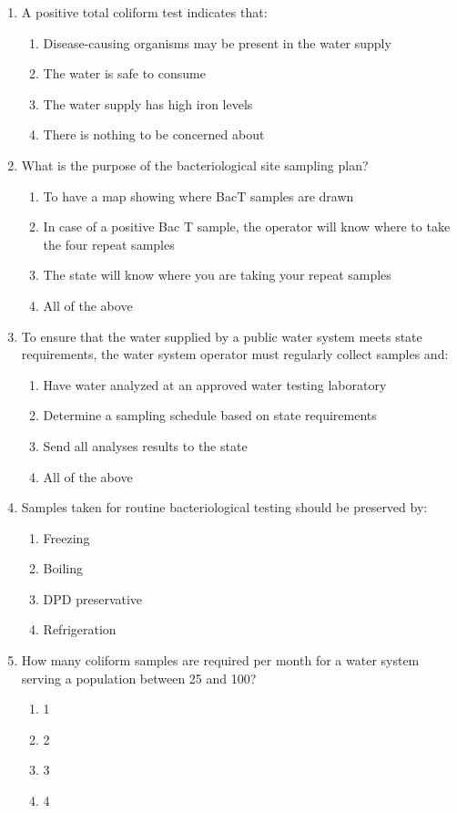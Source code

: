 \documentclass{article}
\begin{document}
\begin{enumerate}[1.]
\item A positive total coliform test indicates that:
\begin{enumerate}
\item Disease-causing organisms may be present in the water supply
\item The water is safe to consume
\item The water supply has high iron levels
\item There is nothing to be concerned about
\end{enumerate}

\item What is the purpose of the bacteriological site sampling plan?
\begin{enumerate}
\item To have a map showing where BacT samples are drawn
\item In case of a positive Bac T sample, the operator will know where to take the
four repeat samples
\item The state will know where you are taking your repeat samples
\item All of the above
\end{enumerate}
\item To ensure that the water supplied by a public water system meets state requirements, the water system operator must regularly collect samples and:
\begin{enumerate}
\item Have water analyzed at an approved water testing laboratory
\item Determine a sampling schedule based on state requirements
\item Send all analyses results to the state
\item All of the above
\end{enumerate}
\item Samples taken for routine bacteriological testing should be preserved by:
\begin{enumerate}
\item Freezing
\item Boiling
\item DPD preservative
\item Refrigeration
\end{enumerate}

\item How many coliform samples are required per month for a water system serving a population between 25 and 100?
\begin{enumerate}
\item 1
\item 2
\item 3
\item 4
\end{enumerate}


\end{enumerate}
\end{document}

